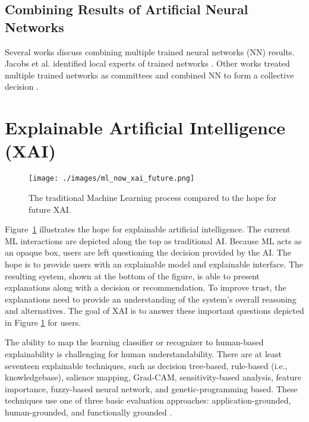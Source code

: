 \subsection{Combining Results of Artificial Neural Networks}


Several works discuss combining multiple trained neural networks (NN) results.
Jacobs et al. identified local experts of trained networks \cite{6797059}. Other
works treated multiple trained networks as committees and combined NN to form a
collective decision \cite{perrone1993putting, bishop1995neural,
sharkey1996combining}.

\section{Explainable Artificial Intelligence (XAI)}

\begin{figure}[h]
    \texttt{[image: ./images/ml\_now\_xai\_future.png]}
    \caption{The traditional Machine Learning process compared to the hope for future XAI\cite{dw2019darpa}.}
    \label{fig:ml_now_xai_future}
\end{figure}

Figure~\ref{fig:ml_now_xai_future} illustrates the hope for explainable
artificial intelligence. The current ML interactions are depicted along the top
as traditional AI. Because ML acts as an opaque box, users are left questioning
the decision provided by the AI. The hope is to provide users with an explainable model and
explainable interface. The resulting system, shown at the bottom of the figure,
is able to present explanations along with a decision or recommendation. To
improve trust, the explanations need to provide an understanding of the system's
overall reasoning and alternatives. The goal of XAI is to answer these important
questions depicted in Figure \ref{fig:ml_now_xai_future} for
users\cite{dw2019darpa}.

The ability to map the learning classifier or recognizer to human-based
explainability is challenging for human understandability. There are at least
seventeen explainable techniques, such as decision tree-based, rule-based (i.e.,
knowledgebase), salience mapping, Grad-CAM, sensitivity-based analysis, feature
importance, fuzzy-based neural network, and genetic-programming based. These
techniques use one of three basic evaluation approaches: application-grounded,
human-grounded, and functionally grounded
\cite{Survey18,Fuzzy19,Hagras18,GP18,selvaraju2017grad,doshi2017towards}.

